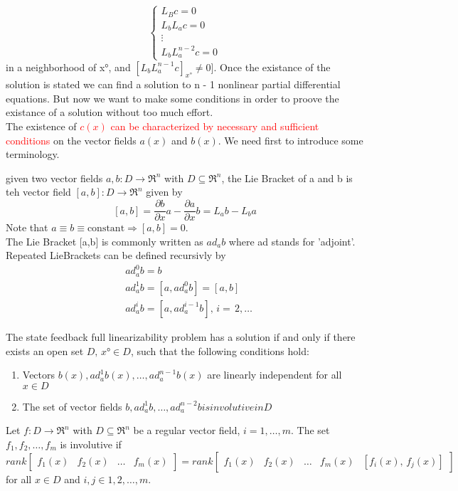  	 \begin{equation*}
	\left\{
	\begin{array}{ll}	
		L_Bc=0\\
		L_bL_ac=0\\
		\vdots\\
		L_bL_a^{n-2}c=0
	\end{array}
	\right.
\end{equation*} in a neighborhood of x°, and $[L_bL_a^{n-1}c]_{x°}\neq0]$. Once the existance of the solution is stated we can find a solution to n - 1 nonlinear partial differential equations. But now we want to make some conditions in order to proove the existance of a solution without too much effort.\\
The existence of \textcolor{red}{$c(x)$ can be characterized by necessary and sufficient conditions} on the vector fields $a(x)$ and $b(x)$.
We need first to introduce some terminology.\\
\begin{defn}
	given two vector fields $a,b:D\to\Re^n$ with $D\subseteq\Re^n$, the Lie Bracket of a and b is teh vector field $[a,b]:D\to\Re^n$ given by \[
	[a,b]=\frac{\partial b}{\partial x}a-\frac{\partial a }{\partial x}b=L_ab-L_ba
	\]Note that $a\equiv b\equiv\text{constant}\Rightarrow[a,b]=0$.\\The Lie Bracket [a,b] is commonly written as $ad_ab$ where ad stands for 'adjoint'. Repeated LieBrackets can be defined recursivly by
	\[
	\begin{aligned}
		&ad_a^0b=b\\
		&ad_a^1b=[a,ad_a^0b]=[a,b]\\
		&ad_a^ib=[a,ad_a^{i-1}b],\, i=\,2,\dots
	\end{aligned}
	\]
\end{defn}
\begin{thm}
	The state feedback full linearizability problem has a solution if and only if there exists an open set $D, \, x°\in D$, such that the following conditions hold:
	\begin{enumerate}
		\item Vectors ${b(x),ad_a^1b(x),\dots,ad_a^{n-1}b(x)}$ are linearly independent for all $x\in D$
		\item The set of vector fields ${b,ad_a^1b,\dots,ad_a^{n-2}b} is involutive in D$
	\end{enumerate}
\end{thm}
\begin{defn}
	Let $f:D\to\Re^n$ with $D\subseteq\Re^n$ be a regular vector field, $i=1,\dots,m$. The set ${f_1,f_2,\dots,f_m}$ is involutive if \[
	rank\begin{bmatrix}
		f_1(x) & f_2(x) & \dots & f_m(x)
	\end{bmatrix}=rank\begin{bmatrix}
	f_1(x) & f_2(x) & \dots & f_m(x) & [f_i(x),\, f_j(x)]
\end{bmatrix}
	\]
	for all $x\in D$ and $i,j \in {1,2,\dots,m}$.
\end{defn}
